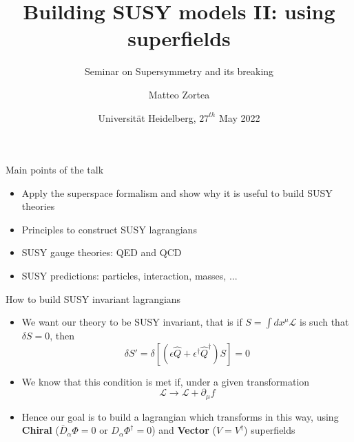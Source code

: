 \documentclass[10pt]{beamer}
\title{Building SUSY models II: using superfields}
\subtitle{Seminar on Supersymmetry and its breaking}
\author{Matteo Zortea}
\date{Universit\"at Heidelberg, $27^{th}$ May 2022}
\institute{Coordinated by prof. J\"org J\"ackel}
\begin{document}
\begin{frame}
\titlepage
\end{frame}

\begin{frame}{Main points of the talk}
\begin{itemize}
    \item Apply the superspace formalism and show why it is useful to build SUSY theories
    \item Principles to construct SUSY lagrangians 
    \item SUSY gauge theories: QED and QCD
    \item SUSY predictions: particles, interaction, masses, ...
\end{itemize}
\end{frame}

\begin{frame}{How to build SUSY invariant lagrangians}
    \begin{itemize}
        \item We want our theory to be SUSY invariant, that is if $S = \int dx^\mu \mathcal{L}$ is such that 
            $\delta S = 0$, then 
            \begin{equation*} 
                \delta S' = \delta \left[\left(\epsilon \hat Q + \epsilon^\dagger \hat Q^{\dagger}\right) S \right] = 0
            \end{equation*}
        \item We know that this condition is met if, under a given transformation
            \begin{equation*}
                \mathcal{L} \to \mathcal{L} + \partial_\mu f
            \end{equation*}
        \item Hence our goal is to build a lagrangian which transforms in this way, using \textbf{Chiral} ($\bar D_{\dot\alpha} \Phi = 0$ or $D_{\alpha}\Phi^{\dagger} = 0$) and \textbf{Vector} ($V=V^{\dagger}$) superfields
    \end{itemize}
\end{frame}
\end{document}
